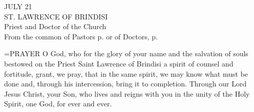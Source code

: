 \begin{center}\normalsize JULY 21\\
\footnotesize ST. LAWRENCE OF BRINDISI\\
\footnotesize Priest and Doctor of the Church\\
\footnotesize From the common of Pastors p.     or of Doctors, p. \\
\end{center}

\hangindent=\parindent \small{PRAYER 
O God, who for the glory of your name
and the salvation of souls
bestowed on the Priest Saint Lawrence of Brindisi
a spirit of counsel and fortitude,
grant, we pray, that in the same spirit,
we may know what must be done
and, through his intercession,
bring it to completion.
Through our Lord Jesus Christ, your Son,
who lives and reigns with you in the unity of the Holy Spirit,
one God, for ever and ever.\\}
 
